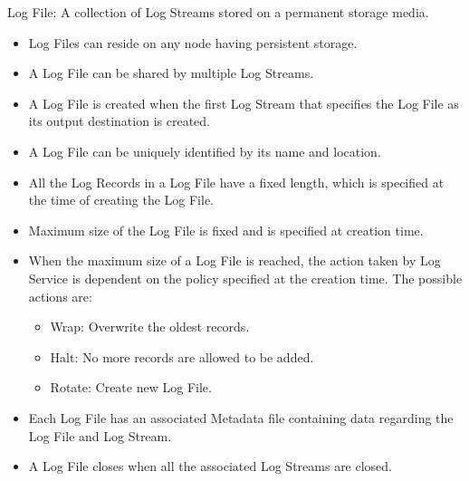 \begin{flushleft}
\begin{Desc}	
\item
[Log File:] A collection of Log Streams stored on a permanent storage media.
\begin{itemize}
\item	Log Files can reside on any node having persistent storage.
\item	A Log File can be shared by multiple Log Streams.
\item	A Log File is created when the first Log Stream that specifies the Log File as its output destination is created. 
\item	A Log File can be uniquely identified by its name and location.
\item	All the Log Records in a Log File have a fixed length, which is specified at the time of creating the Log File.
\item	Maximum size of the Log File is fixed and is specified at creation time.
\item	When the maximum size of a Log File is reached, the action taken by Log Service is dependent on the policy specified at the creation time. The 
possible actions are:
\begin{itemize}
\item   Wrap: Overwrite the oldest records.
\item	Halt: No more records are allowed to be added.
\item	Rotate: Create new Log File.
\end{itemize}
\item	Each Log File has an associated Metadata file containing data regarding the Log File and Log Stream.
\item	A Log File closes when all the associated Log Streams are closed.
\end{itemize}
\end{Desc}




\end{flushleft}
